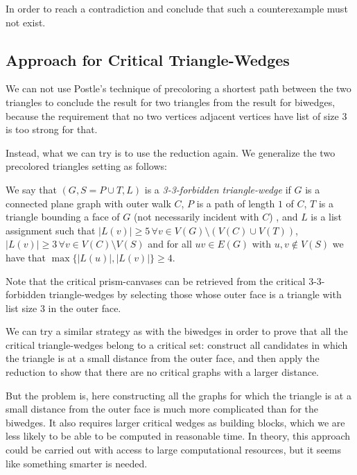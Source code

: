 In order to reach a contradiction and conclude that such a counterexample must not exist. 

\subsection{Approach for Critical Triangle-Wedges} 

We can not use Postle's technique of precoloring a shortest path between the two
triangles to conclude the result for two triangles from the result for biwedges, because the
requirement that no two vertices adjacent vertices have list of size $3$ is too strong for
that.

Instead, what we can try is to use the reduction again. We generalize the two precolored triangles
setting as follows:

\begin{definition}
We say that $(G, S = P \cup T, L)$ is a \emph{3-3-forbidden triangle-wedge} if $G$ is a connected plane 
graph
 with outer walk $C$, $P$ is a  path of length $1$ of $C$, $T$ is a triangle bounding a face
 of $G$ (not necessarily incident with $C$)
 , and $L$ is a list assignment
  such that $|L(v)| \geq 5 \, \forall v \in V(G) \setminus (V(C) \cup V(T))$,
   $|L(v)| \geq 3 \, \forall v \in V(C) \setminus V(S)$ and for all $uv \in E(G)$ with 
   $u, v \not\in V(S)$ we have that $\max\{|L(u)|, |L(v)|\} \geq 4$. 
\end{definition}

Note that the critical prism-canvases can be retrieved from the critical 3-3-forbidden 
triangle-wedges by selecting those whose outer face is a triangle with list size $3$ in the outer
face. 

We can try a similar strategy as with the biwedges in order to prove that all the critical 
triangle-wedges belong to a critical set: construct all candidates in which the triangle is at a 
small distance from the outer face, and then apply the reduction to show that there are no critical
graphs with a larger distance.

But the problem is, here constructing all the graphs for which the triangle is at a small distance
from the outer face is much more complicated than for the biwedges.
It also requires larger critical wedges as building blocks, which we are less likely to be able to
be computed in reasonable time. In theory, this approach could be carried out with access to large
computational resources, but it seems like something smarter is needed. 

